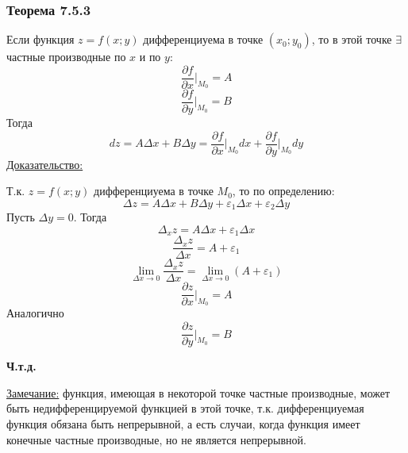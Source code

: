 \documentclass[12pt]{article}
\begin{document}
    \subsubsection*{Теорема 7.5.3}\label{th:7.5.3}
    Если функция $z = f(x; y)$ дифференциуема в точке $(x_0; y_0)$, то в этой точке $\exists$ частные производные по $x$ и по $y$:
    \[ \frac{\partial f}{\partial x} \Big|_{M_0} = A \]
    \[ \frac{\partial f}{\partial y} \Big|_{M_0} = B \]
    Тогда 
    \[ dz = A\Delta x + B\Delta y = \frac{\partial f}{\partial x} \Big|_{M_0}dx + \frac{\partial f}{\partial y} \Big|_{M_0}dy \]
    \underline{Доказательство:}
    \begin{adjustwidth}{1.5em}{1.5em}
        Т.к. $z = f(x;y)$ дифференциуема в точке $M_0$, то по определению:
        \[ \Delta z = A \Delta x + B \Delta y + \varepsilon_1 \Delta x + \varepsilon_2 \Delta y \]
        Пусть $\Delta y = 0$. Тогда 
        \[ \Delta_x z = A \Delta x + \varepsilon_1 \Delta x \]
        \[ \frac{\Delta_x z}{\Delta x} = A + \varepsilon_1 \]
        \[ \lim_{\Delta x \to 0} \frac{\Delta_x z}{\Delta x} = \lim_{\Delta x \to 0}(A + \varepsilon_1) \]
        \[ \frac{\partial z}{\partial x} \Big|_{M_0} = A \]
        Аналогично
        \[ \frac{\partial z}{\partial y} \Big|_{M_0} = B \]
        \begin{center}
            \textbf{Ч.т.д.}
        \end{center}
    \end{adjustwidth}
    \underline{Замечание:} функция, имеющая в некоторой точке частные производные, может быть недифференцируемой функцией в этой точке, т.к. дифференциуемая функция обязана быть непрерывной, а есть случаи, когда функция имеет конечные частные производные, но не является непрерывной.
\end{document}
